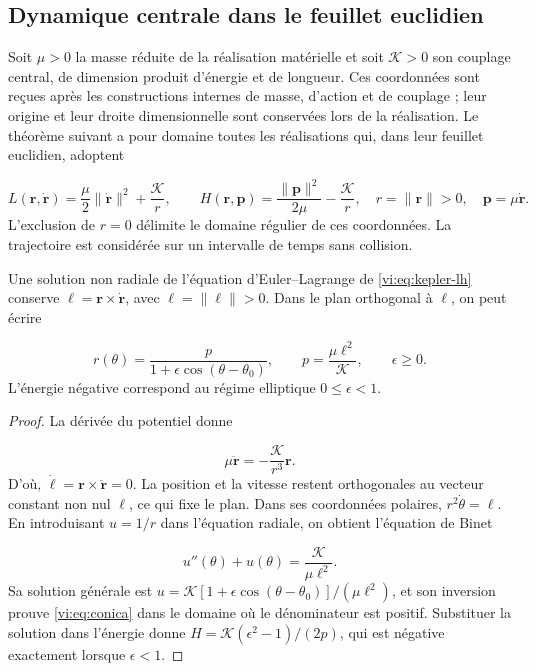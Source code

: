 \subsection{Dynamique centrale dans le feuillet euclidien
}
\label{vi:subsec:dinamica-central}

Soit $\mu>0$ la masse réduite de la réalisation matérielle et soit
$\mathcal K>0$ son couplage central, de dimension
produit d’énergie et de longueur. Ces coordonnées sont reçues après
les constructions internes de masse, d’action et de couplage ;
leur origine et leur droite dimensionnelle sont conservées lors de la
réalisation. Le théorème suivant a pour domaine toutes
les réalisations qui, dans leur feuillet euclidien, adoptent

\begin{equation}
 L(\mathbf r,\dot{\mathbf r})
 =\frac\mu2\|\dot{\mathbf r}\|^2+\frac{\mathcal K}{r},
 \qquad
 H(\mathbf r,\mathbf p)
 =\frac{\|\mathbf p\|^2}{2\mu}-\frac{\mathcal K}{r},
 \quad r=\|\mathbf r\|>0,
 \quad\mathbf p=\mu\dot{\mathbf r}.
 \label{vi:eq:kepler-lh}
\end{equation}
L’exclusion de $r=0$ délimite le domaine régulier de ces
coordonnées. La trajectoire est considérée sur un intervalle de
temps sans collision.


\begin{proposition}
\label{vi:prop:conica}
Une solution non radiale de l’équation d’Euler--Lagrange de
\eqref{vi:eq:kepler-lh} conserve
$\boldsymbol\ell=\mathbf r\times\dot{\mathbf r}$, avec
$\ell=\|\boldsymbol\ell\|>0$. Dans le plan orthogonal à
$\boldsymbol\ell$, on peut écrire

\begin{equation}
 r(\theta)=\frac{p}{1+\epsilon\cos(\theta-\theta_0)},
 \qquad p=\frac{\mu\ell^2}{\mathcal K},
 \qquad \epsilon\geq0.
 \label{vi:eq:conica}
\end{equation}
L’énergie négative correspond au régime elliptique
$0\leq\epsilon<1$.

\end{proposition}
\begin{proof}
La dérivée du potentiel donne

\begin{equation}
 \mu\ddot{\mathbf r}=-\frac{\mathcal K}{r^3}\mathbf r.
 \label{vi:eq:fuerza-central}
\end{equation}
D’où,
$\dot{\boldsymbol\ell}=\mathbf r\times\ddot{\mathbf r}=0$.
La position et la vitesse restent orthogonales au vecteur
constant non nul $\boldsymbol\ell$, ce qui fixe le plan.
Dans ses coordonnées polaires, $r^2\dot\theta=\ell$. En introduisant
$u=1/r$ dans l’équation radiale, on obtient l’équation de Binet

\[
 u''(\theta)+u(\theta)=\frac{\mathcal K}{\mu\ell^2}.
\]
Sa solution générale est
$u=\mathcal K[1+\epsilon\cos(\theta-\theta_0)]/(\mu\ell^2)$,
et son inversion prouve \eqref{vi:eq:conica} dans le domaine
où le dénominateur est positif. Substituer la solution dans
l’énergie donne
$H=\mathcal K(\epsilon^2-1)/(2p)$, qui est négative
exactement lorsque $\epsilon<1$.

\end{proof}

